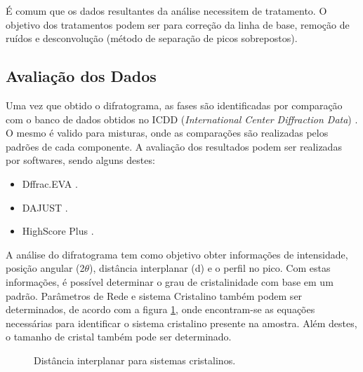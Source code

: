 É comum que os dados resultantes da análise necessitem de tratamento. O objetivo
dos tratamentos podem ser para correção da linha de base, remoção de ruídos e
desconvolução (método de separação de picos sobrepostos).

\subsection{Avaliação dos Dados}

Uma vez que obtido o difratograma, as fases são identificadas por comparação
com o banco de dados obtidos no ICDD (\textit{International Center Diffraction
Data}) \cite{bookMaterialsCharacterizationYang}. O mesmo é valido para misturas,
onde as comparações são realizadas pelos padrões de cada componente. A avaliação
dos resultados podem ser realizadas por softwares,
sendo alguns destes:

\begin{itemize}
    \item Dffrac.EVA \cite{webSiteDiffracEva}.
    \item DAJUST \cite{articleDajust}.
    \item HighScore Plus \cite{webHighScorePlus}.
\end{itemize}

A análise do difratograma tem como objetivo obter informações
de intensidade, posição angular (2$\theta$), distância interplanar (d)
e o perfil no pico. Com estas informações, é possível determinar
o grau de cristalinidade com base em um padrão. Parâmetros de Rede e sistema
Cristalino também podem ser determinados, de acordo com a figura \ref{figureCristalineSistem}, 
onde encontram-se as equações necessárias para identificar
o sistema cristalino presente na amostra. Além destes, o tamanho de cristal também
pode ser determinado.

\begin{figure}[ht]
    \center
    \begin{minipage}{14cm}
     \caption{Distância interplanar para sistemas cristalinos.}\label{figureCristalineSistem} 
     \end{minipage}
\end{figure}

